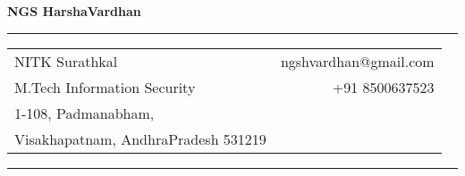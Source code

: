 \documentclass[letterpaper,11pt,oneside]{article}
\begin{document}
\Large{\textbf{NGS HarshaVardhan}}\\
\vspace{1em}
\noindent\rule{\textwidth}{1pt}

\normalsize

\begin{tabular}{l r}

NITK Surathkal  & \hspace{1in} ngshvardhan@gmail.com\\
M.Tech Information Security & \hspace{1in} +91 8500637523\\
1-108, Padmanabham, & \\
Visakhapatnam, AndhraPradesh 531219

\end{tabular}

\noindent\rule{\textwidth}{1pt}

\vspace{1em}
\end{document}
